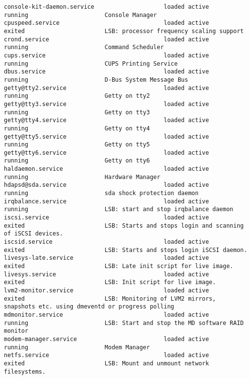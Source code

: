 \documentclass[titlepage]{article}
\begin{document}
\begin{lstlisting}
console-kit-daemon.service                    loaded active       running                      Console Manager
cpuspeed.service                              loaded active       exited                       LSB: processor frequency scaling support
crond.service                                 loaded active       running                      Command Scheduler
cups.service                                  loaded active       running                      CUPS Printing Service
dbus.service                                  loaded active       running                      D-Bus System Message Bus
getty@tty2.service                            loaded active       running                      Getty on tty2
getty@tty3.service                            loaded active       running                      Getty on tty3
getty@tty4.service                            loaded active       running                      Getty on tty4
getty@tty5.service                            loaded active       running                      Getty on tty5
getty@tty6.service                            loaded active       running                      Getty on tty6
haldaemon.service                             loaded active       running                      Hardware Manager
hdapsd@sda.service                            loaded active       running                      sda shock protection daemon
irqbalance.service                            loaded active       running                      LSB: start and stop irqbalance daemon
iscsi.service                                 loaded active       exited                       LSB: Starts and stops login and scanning of iSCSI devices.
iscsid.service                                loaded active       exited                       LSB: Starts and stops login iSCSI daemon.
livesys-late.service                          loaded active       exited                       LSB: Late init script for live image.
livesys.service                               loaded active       exited                       LSB: Init script for live image.
lvm2-monitor.service                          loaded active       exited                       LSB: Monitoring of LVM2 mirrors, snapshots etc. using dmeventd or progress polling
mdmonitor.service                             loaded active       running                      LSB: Start and stop the MD software RAID monitor
modem-manager.service                         loaded active       running                      Modem Manager
netfs.service                                 loaded active       exited                       LSB: Mount and unmount network filesystems.

\end{lstlisting}
\end{document}
